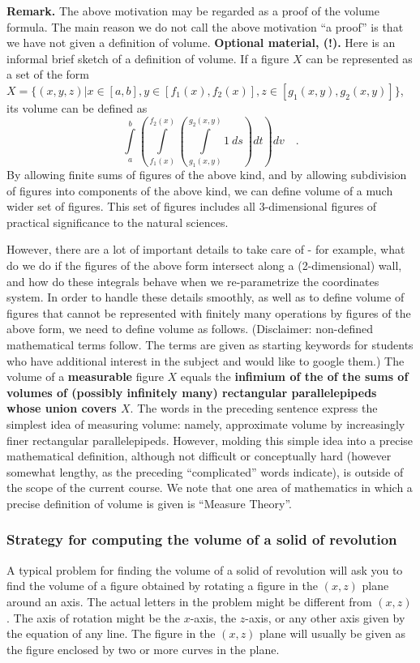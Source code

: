 \documentclass[12pt]{book}
\renewcommand{\emph}{\textbf}
\begin{document}
\textbf{Remark.} The above motivation may be regarded as a proof of the volume formula. The main reason we do not call the above motivation ``a proof'' is that we have not given a definition of volume. \textbf{Optional material, (!).} Here is an informal brief sketch  of a definition of volume. If a figure $X$ can be represented as a set of the form $X= \{(x,y,z)| x\in [a,b], y\in [f_1(x), f_2(x)], z\in [g_1(x,y),  g_2(x,y)]\}$, its volume can be defined as 
\[
\int\limits_a^b \left(\int\limits_{f_1(x)}^{f_2(x)}\left(\int\limits_{g_1(x,y)}^{g_2(x,y)} 1 ~ ds \right)dt \right)dv \quad .
\]
By allowing finite sums of figures of the above kind, and by allowing subdivision of figures into components of the above kind, we can define volume of a much wider set of figures. This set of figures includes all 3-dimensional figures of practical significance to  the natural sciences. 

However, there are a lot of important details to take care of - for example, what do we do if the figures of the above form intersect along a (2-dimensional) wall, and how do these integrals behave when we re-parametrize the coordinates system. In order to handle these details smoothly, as well as to define volume of figures that cannot be represented with finitely many operations by  figures of the above form,  we need to define volume as follows. (Disclaimer: non-defined mathematical terms follow. The terms are given as starting keywords for students who have additional interest in the subject and would like to google them.) The volume of a \emph{measurable} figure $X$ equals the \emph{infimium of the of the sums of volumes of (possibly infinitely many) rectangular parallelepipeds whose union covers $X$}. The words in the preceding sentence express the simplest idea of measuring volume: namely, approximate volume by increasingly finer rectangular parallelepipeds. However, molding this simple idea into a precise mathematical definition, although not difficult or conceptually hard (however somewhat lengthy, as the preceding ``complicated'' words indicate), is outside of the scope of the current course. We note that one area of mathematics in which a precise definition of volume is given is ``Measure Theory''.
\subsubsection{Strategy for computing the volume of a solid of revolution}

A typical problem for finding the volume of a solid of revolution will ask you to find the volume of a figure obtained by rotating a figure in the $(x,z)$ plane around an axis. The actual letters in the problem might be different from $(x,z)$. The axis of rotation might be the $x$-axis, the $z$-axis, or any other axis given by the equation of any line. The figure in the $(x,z)$ plane will usually be given as the figure enclosed by two or more curves in the plane.
\end{document}
